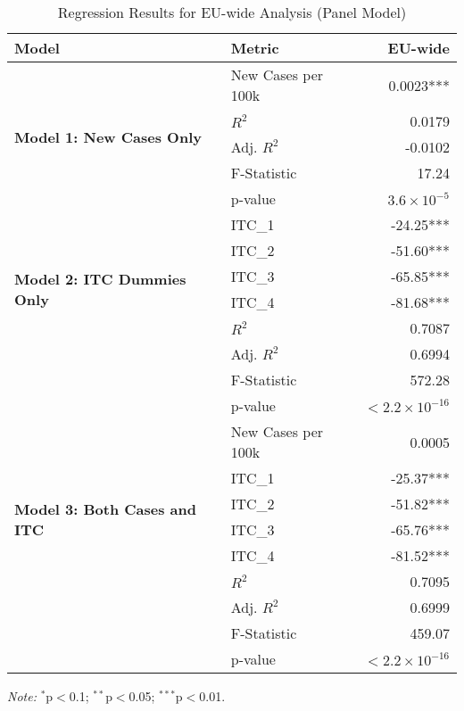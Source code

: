 \documentclass[12pt,onehalfspacing,headsepline,oneside,openright,a4paper, fleqn]{report}
\begin{document}
\begin{table}[H]
\centering
\caption{Regression Results for EU-wide Analysis (Panel Model)}
\label{tab:regression_results_eu}
\renewcommand{\arraystretch}{1.45} 
\begin{tabular}{llr}
\toprule
\textbf{Model} & \textbf{Metric} & \textbf{EU-wide} \\
\midrule
\multirow{5}{*}{\textbf{Model 1: New Cases Only}} 
    & New Cases per 100k  & 0.0023*** \\
    & $R^2$               & 0.0179 \\
    & Adj. $R^2$          & -0.0102 \\
    & F-Statistic         & 17.24 \\
    & p-value             & $3.6 \times 10^{-5}$ \\
\cmidrule(lr){1-3}
\multirow{6}{*}{\textbf{Model 2: ITC Dummies Only}} 
    & ITC\_1              & -24.25*** \\
    & ITC\_2              & -51.60*** \\
    & ITC\_3              & -65.85*** \\
    & ITC\_4              & -81.68*** \\
    & $R^2$               & 0.7087 \\
    & Adj. $R^2$          & 0.6994 \\
    & F-Statistic         & 572.28 \\
    & p-value             & $< 2.2 \times 10^{-16}$ \\
\cmidrule(lr){1-3}
\multirow{7}{*}{\textbf{Model 3: Both Cases and ITC}} 
    & New Cases per 100k  & 0.0005 \\
    & ITC\_1              & -25.37*** \\
    & ITC\_2              & -51.82*** \\
    & ITC\_3              & -65.76*** \\
    & ITC\_4              & -81.52*** \\
    & $R^2$               & 0.7095 \\
    & Adj. $R^2$          & 0.6999 \\
    & F-Statistic         & 459.07 \\
    & p-value             & $< 2.2 \times 10^{-16}$ \\
\bottomrule
\end{tabular}
\renewcommand{\arraystretch}{1} 
\vspace{0.5em} 
\newline
\footnotesize \textit{Note:} $^{*}$p$<$0.1; $^{**}$p$<$0.05; $^{***}$p$<$0.01.
\end{table}
\end{document}
